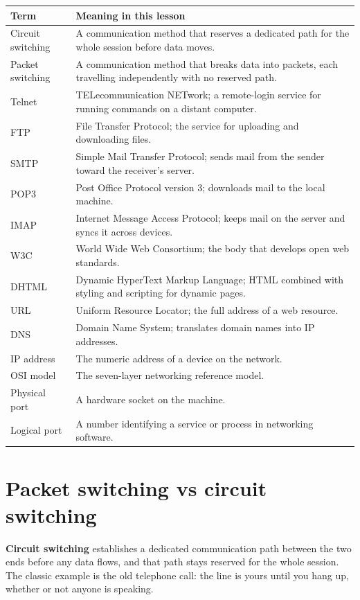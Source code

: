 \begin{center}
\begin{tabular}{p{}p{}}
\toprule
\textbf{Term} & \textbf{Meaning in this lesson} \\
\midrule
Circuit switching & A communication method that reserves a dedicated path for the whole session before data moves. \\
Packet switching & A communication method that breaks data into packets, each travelling independently with no reserved path. \\
Telnet & TELecommunication NETwork; a remote-login service for running commands on a distant computer. \\
FTP & File Transfer Protocol; the service for uploading and downloading files. \\
SMTP & Simple Mail Transfer Protocol; sends mail from the sender toward the receiver's server. \\
POP3 & Post Office Protocol version 3; downloads mail to the local machine. \\
IMAP & Internet Message Access Protocol; keeps mail on the server and syncs it across devices. \\
W3C & World Wide Web Consortium; the body that develops open web standards. \\
DHTML & Dynamic HyperText Markup Language; HTML combined with styling and scripting for dynamic pages. \\
URL & Uniform Resource Locator; the full address of a web resource. \\
DNS & Domain Name System; translates domain names into IP addresses. \\
IP address & The numeric address of a device on the network. \\
OSI model & The seven-layer networking reference model. \\
Physical port & A hardware socket on the machine. \\
Logical port & A number identifying a service or process in networking software. \\
\bottomrule
\end{tabular}
\end{center}

\section{Packet switching vs circuit switching}
\textbf{Circuit switching} establishes a dedicated communication path between
the two ends before any data flows, and that path stays reserved for the whole
session. The classic example is the old telephone call: the line is yours
until you hang up, whether or not anyone is speaking.


